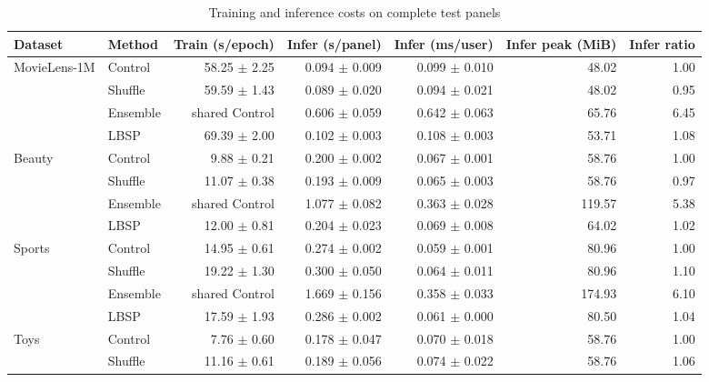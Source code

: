 \begin{table}[!htbp]
\centering
\caption{Training and inference costs on complete test panels}
\label{tab:measured-costs-appendix}
\fontsize{8.5}{11}\selectfont\setlength{\tabcolsep}{3pt}
\begin{tabular*}{\textwidth}{@{\extracolsep{\fill}}llrrrrr@{}}
\toprule
Dataset & Method & Train (s/epoch) & Infer (s/panel) & Infer (ms/user) & Infer peak (MiB) & Infer ratio\\
\midrule
MovieLens-1M & Control & 58.25 $\pm$ 2.25 & 0.094 $\pm$ 0.009 & 0.099 $\pm$ 0.010 & 48.02 & 1.00\\ %
 & Shuffle & 59.59 $\pm$ 1.43 & 0.089 $\pm$ 0.020 & 0.094 $\pm$ 0.021 & 48.02 & 0.95\\ %
 & Ensemble & shared Control & 0.606 $\pm$ 0.059 & 0.642 $\pm$ 0.063 & 65.76 & 6.45\\ %
 & LBSP & 69.39 $\pm$ 2.00 & 0.102 $\pm$ 0.003 & 0.108 $\pm$ 0.003 & 53.71 & 1.08\\ %
\midrule
Beauty & Control & 9.88 $\pm$ 0.21 & 0.200 $\pm$ 0.002 & 0.067 $\pm$ 0.001 & 58.76 & 1.00\\ %
 & Shuffle & 11.07 $\pm$ 0.38 & 0.193 $\pm$ 0.009 & 0.065 $\pm$ 0.003 & 58.76 & 0.97\\ %
 & Ensemble & shared Control & 1.077 $\pm$ 0.082 & 0.363 $\pm$ 0.028 & 119.57 & 5.38\\ %
 & LBSP & 12.00 $\pm$ 0.81 & 0.204 $\pm$ 0.023 & 0.069 $\pm$ 0.008 & 64.02 & 1.02\\ %
\midrule
Sports & Control & 14.95 $\pm$ 0.61 & 0.274 $\pm$ 0.002 & 0.059 $\pm$ 0.001 & 80.96 & 1.00\\ %
 & Shuffle & 19.22 $\pm$ 1.30 & 0.300 $\pm$ 0.050 & 0.064 $\pm$ 0.011 & 80.96 & 1.10\\ %
 & Ensemble & shared Control & 1.669 $\pm$ 0.156 & 0.358 $\pm$ 0.033 & 174.93 & 6.10\\ %
 & LBSP & 17.59 $\pm$ 1.93 & 0.286 $\pm$ 0.002 & 0.061 $\pm$ 0.000 & 80.50 & 1.04\\ %
\midrule
Toys & Control & 7.76 $\pm$ 0.60 & 0.178 $\pm$ 0.047 & 0.070 $\pm$ 0.018 & 58.76 & 1.00\\ %
 & Shuffle & 11.16 $\pm$ 0.61 & 0.189 $\pm$ 0.056 & 0.074 $\pm$ 0.022 & 58.76 & 1.06\\ %

\end{tabular*}
\end{table}
